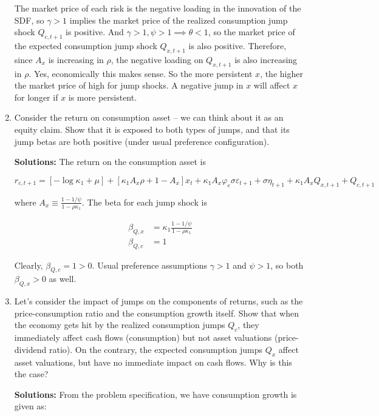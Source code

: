 \documentclass{article}
\begin{document}
\begin{enumerate}
The market price of each risk is the negative loading in the innovation of the SDF, so $\gamma > 1$ implies the market price of the realized consumption jump shock $Q_{c,t+1}$ is positive.  And $\gamma > 1, \psi > 1\implies \theta < 1$, so the market price of the expected consumption jump shock $Q_{x,t+1}$ is also positive. Therefore, since $A_x$ is increasing in $\rho$, the negative loading on $Q_{x,t+1}$ is also increasing in $\rho$.    Yes, economically this makes sense. So the more persistent $x$, the higher the market price of high for jump shocks. A negative jump in $x$ will affect $x$ for longer if $x$ is more persistent.

\item Consider the return on consumption asset – we can think about it as an equity claim. Show that it is exposed to both types of jumps, and that its jump betas are both positive (under usual preference configuration).

\bigskip

\textbf{Solutions:} The return on the consumption asset is

$$
r_{c,t+1} 
= [-\log \kappa_1 + \mu] + [\kappa_1 A_x \rho  + 1 - A_x] x_t + \kappa_1 A_x \varphi_e \sigma \varepsilon_{t+1} + \sigma \eta_{t+1} + \kappa_1 A_x Q_{x,t+1} + Q_{c,t+1}
$$

where $A_x \equiv \frac{1 - 1/\psi}{1 - \rho \kappa_1}$.  The beta for each jump shock is

\begin{align*}
\beta_{Q,x} &= \kappa_1 \frac{1 - 1/\psi}{1 - \rho \kappa_1}\\
\beta_{Q,c} &= 1
\end{align*}

Clearly, $\beta_{Q,c} = 1 > 0$. Usual preference assumptions $\gamma > 1$ and $\psi > 1$, so both $\beta_{Q,x} > 0$ as well.

\pagebreak

\item Let's consider the impact of jumps on the components of returns, such as the price-consumption ratio and the consumption growth itself. Show that when the economy gets hit by the realized consumption jumps $Q_c$, they immediately affect cash flows (consumption) but not asset valuations (price-dividend ratio). On the contrary, the expected consumption jumps $Q_x$ affect asset valuations, but have no immediate impact on cash flows. Why is this the case?

\textbf{Solutions:} From the problem specification, we have consumption growth is given as:


\end{enumerate}
\end{document}
